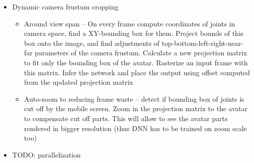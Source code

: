 \begin{itemize}
\begin{itemize}
	\end{itemize}
	\item Dynamic camera frustum cropping
		\begin{itemize}
			\item Around view span -- On every frame compute coordinates of joints in camera space, find a XY-bounding box for them. Project bounds of this box onto the image, and find adjustments of top-bottom-left-right-near-far parameters of the camera frustum. Calculate a new projection matrix to fit only the bounding box of the avatar. Rasterize an input frame with this matrix. Infer the network and place the output using offset computed from the updated projection matrix
			\item Auto-zoom to reducing frame waste -- detect if bounding box of joints is cut off by the mobile screen. Zoom in the projection matrix to the avatar to compensate cut off parts. This will allow to see the avatar parts rendered in bigger resolution (thus DNN has to be trained on zoom scale too)
		\end{itemize}
	
	\item \alert{TODO: parallelization}
\end{itemize}

